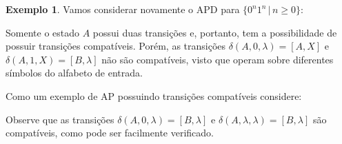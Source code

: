 \documentclass[a4paper]{article}
\theoremstyle{definition}
\newtheorem{Example}{Exemplo}
\begin{document}
  \begin{Example}
    Vamos considerar novamente o APD para $\{0^n1^n\,|\,n \geq 0\}$:
    \begin{figure}[H]
      \centering
    \end{figure}
    Somente o estado $A$ possui duas transições e, portanto, tem a possibilidade
    de possuir transições compatíveis. Porém, as transições $\delta(A,0,\lambda)
    = [A,X]$ e $\delta(A,1,X) = [B,\lambda]$ não são compatíveis, visto que
    operam sobre diferentes símbolos do alfabeto de entrada.

    Como um exemplo de AP possuindo transições compatíveis considere:
    \begin{figure}[H]
      \centering
    \end{figure}
    Observe que as transições $\delta(A,0,\lambda) = [B,\lambda]$ e
    $\delta(A,\lambda,\lambda) = [B,\lambda]$ são compatíveis, como pode ser
    facilmente verificado.
  \end{Example}
\end{document}
